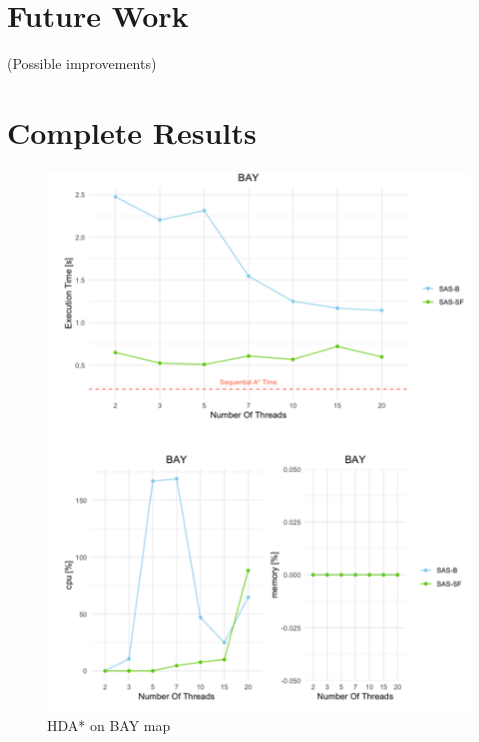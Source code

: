 \documentclass[twocolumn, switch]{article} %
\begin{document}
\section{Future Work}
(Possible improvements)

\section{Complete Results}
\begin{center}
  \begin{figure}[ht!]
    \centering
    \includegraphics[width=1\linewidth]{hda/bay.png}
    \caption{HDA* on BAY map}
    \label{hdabay}
  \end{figure}
\end{center}
\end{document}
